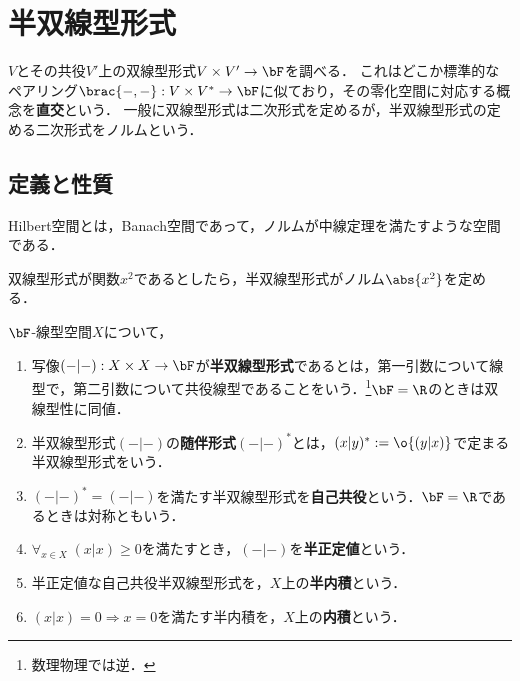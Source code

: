 \documentclass[uplatex, dvipdfmx]{jsreport}
\begin{document}
\section{半双線型形式}

\begin{tcolorbox}[colframe=ForestGreen, colback=ForestGreen!10!white,breakable,colbacktitle=ForestGreen!40!white,coltitle=black,fonttitle=\bfseries\sffamily,
title=]
    $V$とその共役$V'$上の双線型形式$V\times V'\to\bF$を調べる．
    これはどこか標準的なペアリング$\brac{-,-}:V\times V^*\to\bF$に似ており，その零化空間に対応する概念を\textbf{直交}という．
    一般に双線型形式は二次形式を定めるが，半双線型形式の定める二次形式をノルムという．
\end{tcolorbox}

\subsection{定義と性質}

\begin{tcolorbox}[colframe=ForestGreen, colback=ForestGreen!10!white,breakable,colbacktitle=ForestGreen!40!white,coltitle=black,fonttitle=\bfseries\sffamily,
title=]
    Hilbert空間とは，Banach空間であって，ノルムが中線定理を満たすような空間である．

    双線型形式が関数$x^2$であるとしたら，半双線型形式がノルム$\abs{x^2}$を定める．
\end{tcolorbox}

\begin{definition}
    $\bF$-線型空間$X$について，
    \begin{enumerate}
        \item 写像$(-|-):X\times X\to\bF$が\textbf{半双線型形式}であるとは，第一引数について線型で，第二引数について共役線型であることをいう．\footnote{数理物理では逆．}$\bF=\R$のときは双線型性に同値．
        \item 半双線型形式$(-|-)$の\textbf{随伴形式}$(-|-)^*$とは，$(x|y)^*:=\o{(y|x)}$で定まる半双線型形式をいう．
        \item $(-|-)^*=(-|-)$を満たす半双線型形式を\textbf{自己共役}という．$\bF=\R$であるときは対称ともいう．
        \item $\forall_{x\in X}\;(x|x)\ge 0$を満たすとき，$(-|-)$を\textbf{半正定値}という．
        \item 半正定値な自己共役半双線型形式を，$X$上の\textbf{半内積}という．
        \item $(x|x)=0\Rightarrow x=0$を満たす半内積を，$X$上の\textbf{内積}という．
    \end{enumerate}
\end{definition}
\end{document}
